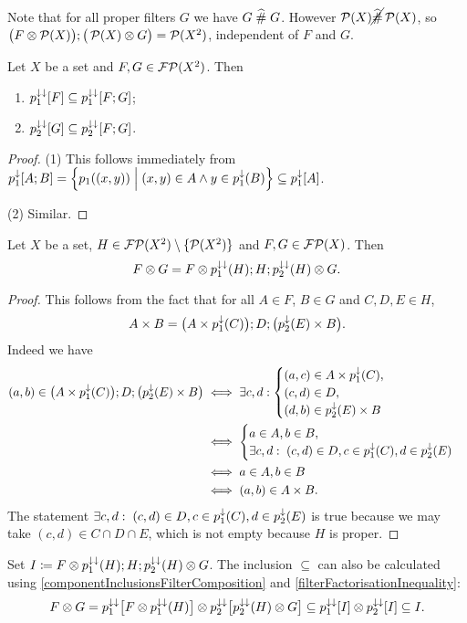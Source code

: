 Note that for all proper filters $G$ we have $G\mathrel{\widehat{\#}} G$. However $\operatorname{\mathcal{P}}(X)\cancel{\mathrel{\widehat{\#}}}\operatorname{\mathcal{P}}(X)$, so $\big(F\otimes \operatorname{\mathcal{P}}(X)\big);\big(\operatorname{\mathcal{P}}(X)\otimes G\big) = \operatorname{\mathcal{P}}(X^2)$, independent of $F$ and $G$.

\begin{lemma} \label{componentInclusionsFilterComposition}
Let $X$ be a set and $F,G\in\operatorname{\mathcal{FP}}(X^2)$. Then
\begin{enumerate}
\item $p_1^{\downarrow\downarrow}[F]\subseteq p_1^{\downarrow\downarrow}[F;G]$;
\item $p_2^{\downarrow\downarrow}[G]\subseteq p_2^{\downarrow\downarrow}[F;G]$.
\end{enumerate}
\end{lemma}
\begin{proof}
(1) This follows immediately from $p_1^{\imf}[A;B] = \setbuilder{p_1((x,y))}{(x,y)\in A \land y\in p_1^{\imf}(B)} \subseteq p_1^{\imf}[A]$.

(2) Similar.
\end{proof}

\begin{lemma} \label{filterCompositionFactorisationLemma}
Let $X$ be a set, $H\in \operatorname{\mathcal{FP}}(X^2)\setminus \{\operatorname{\mathcal{P}}(X^2)\}$ and $F,G\in\operatorname{\mathcal{FP}}(X)$. Then
\[ F\otimes G = F\otimes p_1^{\downarrow\downarrow}(H); H; p_2^{\downarrow\downarrow}(H)\otimes G. \]
\end{lemma}
\begin{proof}
This follows from the fact that for all $A\in F$, $B\in G$ and $C,D,E\in H$,
\[ A\times B = \big(A \times p_1^{\downarrow}(C)\big);D;\big(p_2^\downarrow(E)\times B\big). \]
Indeed we have
\begin{align*}
(a,b)\in \big(A \times p_1^{\downarrow}(C)\big);D;\big(p_2^\downarrow(E)\times B\big) &\iff \exists c,d: \begin{cases}
(a,c)\in A\times p_1^\downarrow(C),\\ (c,d)\in D,\\ (d,b)\in p_2^\downarrow(E)\times B
\end{cases} \\
&\iff \begin{cases}
a\in A, b\in B, \\
\exists c,d: \; (c,d)\in D, c\in p_1^\downarrow(C), d\in p_2^\downarrow(E)
\end{cases} \\
&\iff a\in A, b\in B \\
&\iff (a,b)\in A\times B.
\end{align*}
The statement $\exists c,d: \; (c,d)\in D, c\in p_1^\downarrow(C), d\in p_2^\downarrow(E)$ is true because we may take $(c,d)\in C\cap D\cap E$, which is not empty because $H$ is proper.
\end{proof}
Set $I\coloneqq F\otimes p_1^{\downarrow\downarrow}(H); H; p_2^{\downarrow\downarrow}(H)\otimes G$. The inclusion $\subseteq$ can also be calculated using \ref{componentInclusionsFilterComposition} and \ref{filterFactorisationInequality}:
\[ F\otimes G = p_1^{\downarrow\downarrow}\big[F\otimes p_1^{\downarrow\downarrow}(H)\big] \otimes p_2^{\downarrow\downarrow}\big[p_2^{\downarrow\downarrow}(H)\otimes G\big] \subseteq p_1^{\downarrow\downarrow}[I]\otimes p_2^{\downarrow\downarrow}[I] \subseteq I. \]

